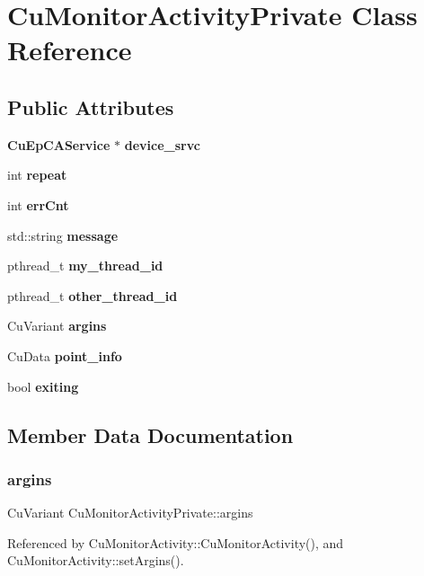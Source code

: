 \section{Cu\+Monitor\+Activity\+Private Class Reference}
\label{classCuMonitorActivityPrivate}
\subsection*{Public Attributes}
\begin{DoxyCompactItemize}
\item 
\textbf{ Cu\+Ep\+C\+A\+Service} $\ast$ \textbf{ device\+\_\+srvc}
\item 
int \textbf{ repeat}
\item 
int \textbf{ err\+Cnt}
\item 
std\+::string \textbf{ message}
\item 
pthread\+\_\+t \textbf{ my\+\_\+thread\+\_\+id}
\item 
pthread\+\_\+t \textbf{ other\+\_\+thread\+\_\+id}
\item 
Cu\+Variant \textbf{ argins}
\item 
Cu\+Data \textbf{ point\+\_\+info}
\item 
bool \textbf{ exiting}
\end{DoxyCompactItemize}


\subsection{Member Data Documentation}
\mbox{\label{classCuMonitorActivityPrivate_aad65696f71e3a49aef9545adfbe0e7a7}} 
\subsubsection{argins}
{\footnotesize\ttfamily Cu\+Variant Cu\+Monitor\+Activity\+Private\+::argins}



Referenced by Cu\+Monitor\+Activity\+::\+Cu\+Monitor\+Activity(), and Cu\+Monitor\+Activity\+::set\+Argins().

\mbox{\label{classCuMonitorActivityPrivate_a8670ac07cd29a34c24f974d27fc34802}} 
